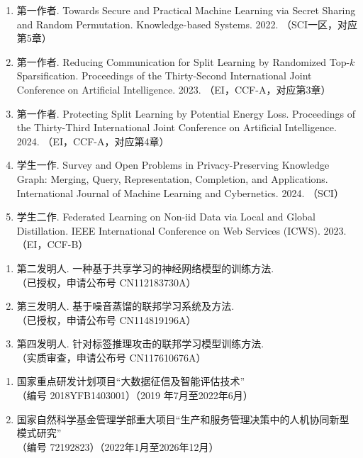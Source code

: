 \cleardoublepage
{}

\begin{enumerate}
    \item 第一作者. Towards Secure and Practical Machine Learning via Secret Sharing and Random Permutation. Knowledge-based Systems. 2022. （SCI一区，对应第5章）
    \item 第一作者. Reducing Communication for Split Learning by Randomized Top-$k$ Sparsification. Proceedings of the Thirty-Second International Joint Conference on Artificial Intelligence. 2023. （EI，CCF-A，对应第3章）
    \item 第一作者. Protecting Split Learning by Potential Energy Loss. Proceedings of the Thirty-Third International Joint Conference on Artificial Intelligence. 2024. （EI，CCF-A，对应第4章）
    \item 学生一作. Survey and Open Problems in Privacy-Preserving Knowledge Graph: Merging, Query, Representation, Completion, and Applications. International Journal of Machine Learning and Cybernetics. 2024. （SCI）
    \item 学生二作. Federated Learning on Non-iid Data via Local and Global Distillation. IEEE International Conference on Web Services (ICWS). 2023. （EI，CCF-B）
\end{enumerate}

\begin{enumerate}
    \item 第二发明人. 一种基于共享学习的神经网络模型的训练方法. \\
    （已授权，申请公布号 CN112183730A）
    \item 第三发明人. 基于噪音蒸馏的联邦学习系统及方法. \\
    （已授权，申请公布号
     CN114819196A）
    \item 第四发明人. 针对标签推理攻击的联邦学习模型训练方法. \\
    （实质审查，申请公布号 CN117610676A）
\end{enumerate}



\begin{enumerate}
    \item 国家重点研发计划项目“大数据征信及智能评估技术”\\
    （编号 2018YFB1403001）（2019 年7月至2022年6月）
    \item 国家自然科学基金管理学部重大项目“生产和服务管理决策中的人机协同新型模式研究”\\
    （编号 72192823）（2022年1月至2026年12月）
\end{enumerate}